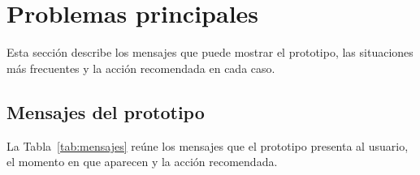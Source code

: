 \documentclass[11pt,letterpaper]{article}
\begin{document}
\section{Problemas principales}
\label{sec:problemas}

Esta sección describe los mensajes que puede mostrar el prototipo, las situaciones más frecuentes y la acción recomendada en cada caso.

\subsection{Mensajes del prototipo}
\label{sec:mensajes}

La Tabla~\ref{tab:mensajes} reúne los mensajes que el prototipo presenta al usuario, el momento en que aparecen y la acción recomendada.
\end{document}
